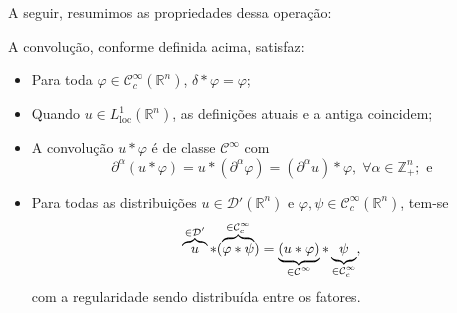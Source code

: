 \documentclass[../distribution_theory_notes.tex]{subfiles}
\begin{document}
A seguir, resumimos as propriedades dessa operação:
\begin{prop*}
	A convolução, conforme definida acima, satisfaz:
	\begin{itemize}
		\item[0)] Para toda \(\varphi \in \mathcal{C}_{c}^{\infty}(\mathbb{R}^{n})\), \(\delta * \varphi = \varphi \);
		\item[1)] Quando \(u\in L_{\mathrm{loc}}^{1}(\mathbb{R}^{n})\), as definições atuais e a antiga coincidem;
		\item[2)] A convolução \(u*\varphi \) é de classe \(\mathcal{C}^{\infty}\) com
		      \[
			      \partial^{\alpha }(u*\varphi ) = u * (\partial^{\alpha }\varphi ) = (\partial^{\alpha }u)*\varphi ,\; \forall \alpha \in \mathbb{Z}_{+}^{n}; \text{ e}
		      \]
		\item[3)] Para todas as distribuições \(u\in \mathcal{D}'(\mathbb{R}^{n})\) e \(\varphi , \psi \in \mathcal{C}_{c}^{\infty}(\mathbb{R}^{n})\), tem-se
		      \[
			      \overbrace{u}^{\mathcal{\in \mathcal{D}'}}*(\overbrace{\varphi* \psi}^{\mathclap{\in \mathcal{C}_{c}^{\infty}}} )= \underbrace{(u*\varphi )}_{\mathclap{\in \mathcal{C}^{\infty}}}*\underbrace{\psi}_{\mathclap{\in \mathcal{C}_{c}^{\infty}}},
		      \]
		      com a regularidade sendo distribuída entre os fatores.
	\end{itemize}
\end{prop*}
\end{document}
